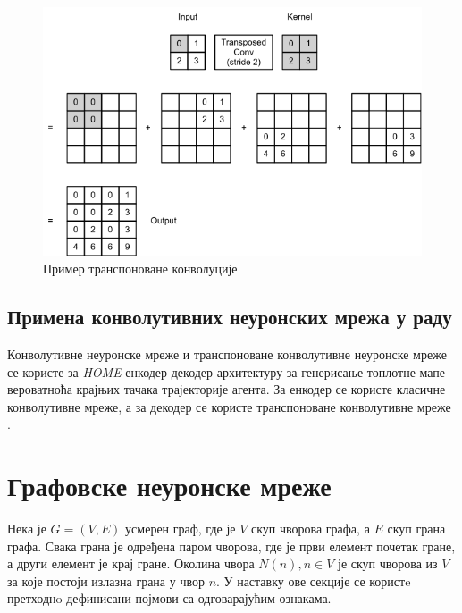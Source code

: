 \documentclass[11pt,oneside]{memoir}
\begin{document}
\begin{figure}[H]
  \centering
  \includegraphics[width=1.0\textwidth]{images/transpose_cnn.png}
  \caption{Пример транспоноване конволуције\protect\footnotemark \label{transpose-ccn}}
\end{figure}


\subsection{Примена конволутивних неуронских мрежа у раду}

Конволутивне неуронске мреже и транспоноване конволутивне неуронске мреже се користе за \textit{HOME} енкодер-декодер архитектуру за
генерисање топлотне мапе вероватноћа крајњих тачака трајекторије агента. За енкодер се користе класичне конволутивне мреже, а за
декодер се користе транспоноване конволутивне мреже \cite{home}.

\section{Графовске неуронске мреже}

Нека је $G = (V, E)$ усмерен граф, где је $V$ скуп чворова графа, а $E$ скуп грана графа. Свака грана је одређена
паром чворова, где је први елемент почетак гране, а други елемент је крај гране. Околина чвора $N(n), n \in V$ је скуп чворова из $V$ 
за које постоји излазна грана у чвор $n$. У наставку ове секције се користe претходнo дефинисани појмови са одговарајућим ознакама.
\end{document}
